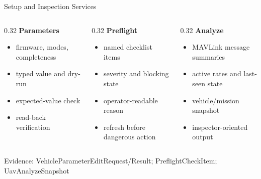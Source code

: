\documentclass[aspectratio=169]{beamer}
\newcommand{\evidence}[1]{%
  \vfill\par\noindent
  \begin{minipage}{\linewidth}
  \raggedright{\color{SoftGray}\tiny Evidence: #1}\par
  \end{minipage}
}
\begin{document}
\begin{frame}{Setup and Inspection Services}
\footnotesize
\begin{columns}[T]
\begin{column}{0.32\textwidth}
\textbf{Parameters}
\begin{itemize}
  \item firmware, modes, completeness
  \item typed value and dry-run
  \item expected-value check
  \item read-back verification
\end{itemize}
\end{column}
\begin{column}{0.32\textwidth}
\textbf{Preflight}
\begin{itemize}
  \item named checklist items
  \item severity and blocking state
  \item operator-readable reason
  \item refresh before dangerous action
\end{itemize}
\end{column}
\begin{column}{0.32\textwidth}
\textbf{Analyze}
\begin{itemize}
  \item MAVLink message summaries
  \item active rates and last-seen state
  \item vehicle/mission snapshot
  \item inspector-oriented output
\end{itemize}
\end{column}
\end{columns}

\vspace{0.75em}
\begin{center}
\end{center}
\evidence{VehicleParameterEditRequest/Result; PreflightCheckItem; UavAnalyzeSnapshot}
\end{frame}
\end{document}

